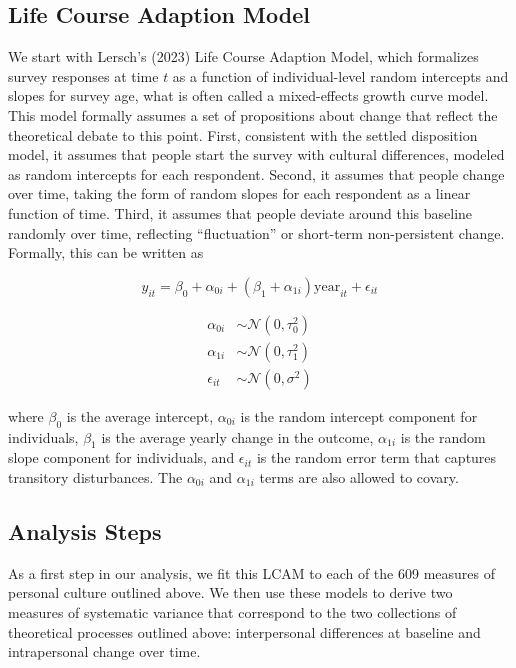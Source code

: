 \documentclass[
  12pt,
]{article}
\begin{document}
\hypertarget{life-course-adaption-model}{%
\subsection{Life Course Adaption
Model}\label{life-course-adaption-model}}

We start with Lersch's (2023) Life Course Adaption Model, which
formalizes survey responses at time \(t\) as a function of
individual-level random intercepts and slopes for survey age, what is
often called a mixed-effects growth curve model. This model formally
assumes a set of propositions about change that reflect the theoretical
debate to this point. First, consistent with the settled disposition
model, it assumes that people start the survey with cultural
differences, modeled as random intercepts for each respondent. Second,
it assumes that people change over time, taking the form of random
slopes for each respondent as a linear function of time. Third, it
assumes that people deviate around this baseline randomly over time,
reflecting ``fluctuation'' or short-term non-persistent change.
Formally, this can be written as

\[
y_{it} = \beta_0 + \alpha_{0i} + (\beta_1 + \alpha_{1i}) \text{year}_{it} + \epsilon_{it}
\]

\[
\begin{aligned}
\alpha_{0i} &\sim \mathcal{N}(0,\tau^2_{0}) \\
\alpha_{1i} &\sim \mathcal{N}(0,\tau^2_{1}) \\
\epsilon_{it} &\sim \mathcal{N}(0,\sigma^2)
\end{aligned}
\]

where \(\beta_0\) is the average intercept, \(\alpha_{0i}\) is the
random intercept component for individuals, \(\beta_1\) is the average
yearly change in the outcome, \(\alpha_{1i}\) is the random slope
component for individuals, and \(\epsilon_{it}\) is the random error
term that captures transitory disturbances. The \(\alpha_{0i}\) and
\(\alpha_{1i}\) terms are also allowed to covary.

\hypertarget{analysis-steps}{%
\subsection{Analysis Steps}\label{analysis-steps}}

As a first step in our analysis, we fit this LCAM to each of the 609
measures of personal culture outlined above. We then use these models to
derive two measures of systematic variance that correspond to the two
collections of theoretical processes outlined above: interpersonal
differences at baseline and intrapersonal change over time.
\end{document}
